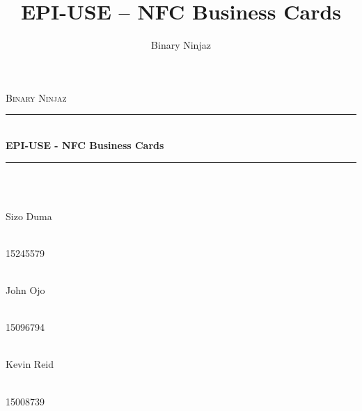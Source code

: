 \documentclass[11pt]{article}
\author{Binary Ninjaz}
\title{EPI-USE -- NFC Business Cards}
\begin{document}
\begin{titlepage}
	
	\begin{center}
		        
       
		\textsc{\LARGE Binary Ninjaz}\\[0.3cm]
		\rule{\linewidth}{0.5mm} \\[1cm]
		{ \huge \bfseries EPI-USE - NFC Business Cards}\\[0.5cm]
		\rule{\linewidth}{0.5mm} \\[1cm] 		
  
		
		\begin{minipage}{0.4\textwidth}
			\begin{flushleft} \large
				\emph{} \\
				Sizo {Duma}
			\end{flushleft}
		\end{minipage}
		\begin{minipage}{0.4\textwidth}
			\begin{flushright} \large
				\emph{} \\
				15245579
			\end{flushright}
		\end{minipage}

		\begin{minipage}{0.4\textwidth}
			\begin{flushleft} \large
            	\emph{} \\
				John {Ojo}
			\end{flushleft}
		\end{minipage}
		\begin{minipage}{0.4\textwidth}
			\begin{flushright} \large
				\emph{} \\
				15096794 
			\end{flushright}
		\end{minipage}
		
		\begin{minipage}{0.4\textwidth}
			\begin{flushleft} \large
				\emph{} \\
				Kevin Reid
			\end{flushleft}
		\end{minipage}
		\begin{minipage}{0.4\textwidth}
			\begin{flushright} \large
				\emph{} \\
				15008739
			\end{flushright}
		\end{minipage}


\end{center}
\end{titlepage}
\end{document}
